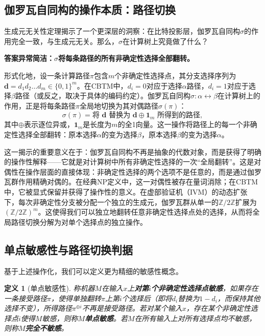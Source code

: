 \documentclass{ctexart}
\newtheorem{definition}[theorem]{定义}
\begin{document}
	\subsection{伽罗瓦自同构的操作本质：路径切换}
	
	生成元无关性定理揭示了一个更深层的洞察：在比特投影层，伽罗瓦自同构$\sigma$的作用完全一致，与生成元无关。那么，$\sigma$在计算树上究竟做了什么？
	
	\textbf{答案异常简洁：$\sigma$将每条路径的所有非确定性选择全部翻转。}
	
	形式化地，设一条计算路径$\pi$包含$m$个非确定性选择点，其分支选择序列为$\mathbf{d} = d_1 d_2 \ldots d_m \in \{0,1\}^m$。在CBTM中，$d_i=0$对应于选择$\alpha$路径，$d_i=1$对应于选择$\beta$路径（或反之，取决于具体的编码约定）。伽罗瓦自同构$\sigma: \alpha \leftrightarrow \beta$在计算树上的作用，正是将每条路径$\pi$全局地切换为其对偶路径$\sigma(\pi)$：
	\[
	\sigma(\pi) = \text{将 } \mathbf{d} \text{ 替换为 } \mathbf{d} \oplus \mathbf{1}_m \text{ 所得到的路径},
	\]
	其中$\oplus$表示逐位异或，$\mathbf{1}_m$是长度为$m$的全1向量。这一操作将路径上的每一个非确定性选择全部翻转：原本选择$\alpha$的变为选择$\beta$，原本选择$\beta$的变为选择$\alpha$。
	
	这一揭示的重要意义在于：伽罗瓦自同构不再是抽象的代数对象，而是获得了明确的操作性解释——它就是对计算树中所有非确定性选择的一次``全局翻转''。这是对偶性在操作层面的直接体现：非确定性选择的两个选项不是任意的，而是通过伽罗瓦群作用精确对偶的。在经典NP定义中，这一对偶性被存在量词消除；在CBTM中，它被显式保留并获得了操作性的意义。在虚部验证机（IVM）的动态扩张下，每次非确定性分支被分配一个独立的生成元，伽罗瓦群从单一的$\mathbb{Z}/2\mathbb{Z}$扩展为$(\mathbb{Z}/2\mathbb{Z})^m$。这使得我们可以独立地翻转任意非确定性选择点处的选择，从而将全局路径切换分解为对单个选择点的独立操作。
	
	\subsection{单点敏感性与路径切换判据}
	
	基于上述操作化，我们可以定义更为精细的敏感性概念。
	
	\begin{definition}[单点敏感性]\label{def:pointwise-sensitivity}
		称机器$M$在输入$x$上\textbf{对第$i$个非确定性选择点敏感}，如果存在一条接受路径$\pi$，使得单独翻转$\pi$上第$i$个选择后（即将$d_i$替换为$1-d_i$，而保持其他选择不变），所得路径$\pi^{\oplus i}$不再是接受路径。若对某个输入$x$，存在某个非确定性选择点$i$使得$M$敏感，则称$M$\textbf{单点敏感}。若$M$在所有输入上对所有选择点均不敏感，则称$M$\textbf{完全不敏感}。
	\end{definition}
	
\end{document}
